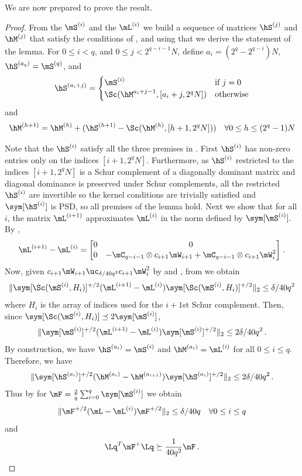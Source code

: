 We are now prepared to prove the result.
\AKMsmall*
\begin{proof}
From the %
%
$\mS^{(i)}$ and the $\mL^{(i)}$  %
we build a sequence of    
%
%
%
matrices $\hS^{(j)}$ and $\hM^{(j)}$ %
%
that satisfy the conditions of , and using that we derive
the statement of the lemma. For $0\leq i < q$, and $0\leq j <2^{q-i-1}N$, define
$a_i= (2^q-2^{q-i})N$, $\hS^{(a_q)}=\mS^{(q)}$, 
and
\[ 
\hS^{(a_i+j)} = \begin{cases}
\mS^{(i)} & \text{if } j=0\\
\Sc(\hM^{a_i+j-1},[a_i+j,2^qN]) & \text{otherwise}\end{cases}\]
and
$$\hM^{(h+1)} = \hM^{(h)}+(\hS^{(h+1)}-\Sc(\hM^{(h)},[h+1,2^qN])) \quad \forall 0\leq h \leq (2^q-1)N$$

Note that the %
$\hS^{(i)}$  %
satisfy all the three premises in . First $\hS^{(i)}$ has non-zero entries only on the indices $[i+ 1,2^q N]$. Furthermore, as $\hS^{(i)}$ restricted to the indices $[i+ 1,2^q N]$ is a Schur complement of a diagonally dominant matrix
%
%
and diagonal dominance is preserved under Schur complements, %
%
%
%
all the restricted %
$\hS^{(i)}$   %
are invertible so the kernel %
conditions  %
are trivially satisfied and $\sym[\hS^{(i)}]$ is PSD, so all premises of the lemma hold. 
Next we show that for all %
$i$,  %
the matrix %
%
$\mL^{(i+1)}$ approximates $\mL^{(i)}$ in the norm defined by $\sym[\mS^{(i)}]$.  By
,
$$\mL^{(i+1)}-\mL^{(i)} = \begin{bmatrix} 0 & 0\\ 0 & -\mC_{q-i-1}\otimes c_{i+1}\mW_{i+1}+\mC_{q-i-1}\otimes c_{i+1}\mW_{i}^2\end{bmatrix}\,.$$  %
Now, given $c_{i+1}\mW_{i+1} \uc_{\delta/40q^2}c_{i+1}\mW_{i}^2$ by  and
, from
%
%
we obtain
\[\|\sym[\Sc(\mS^{(i)},H_i)]^{+/2}(\mL^{(i+1)}-\mL^{(i)})\sym[{\Sc(\mS^{(i)},H_i)}]^{+/2}\|_2 \leq \delta/40q^2\]
where $H_i$
%
is the array of %
indices used for the $i+1$st Schur complement. %
Then,  %
since $\sym[\Sc(\mS^{(i)},H_i)] \preceq 2\sym[\mS^{(i)}]$,
\[\|\sym[{\mS^{(i)}}]^{+/2}(\mL^{(i+1)}-\mL^{(i)})\sym[{\mS^{(i)}}]^{+/2}\|_2 \leq 2\delta/40q^2\,.\]
%
By construction, we have $\hS^{(a_i)}=\mS^{(i)}$ and $\hM^{(a_i)}=\mL^{(i)}$ for all $0\leq i\leq q$. Therefore, we have
$$\|\sym[\hS^{(a_i)}]^{+/2}(\hM^{(a_{i})}-\hM^{(a_{i+1})})\sym[\hS^{(a_i)}]^{+/2}\|_2 \leq 2\delta/40q^2 \,.$$ %
Thus by  for $\mF=\frac{2}{q}\sum_{i=0}^q \sym[\mS^{(i)}]$ we obtain
\[\|\mF^{+/2}(\mL-\mL^{(i)})\mF^{+/2}\|_2\leq \delta/40q \quad \forall 0\leq i\leq q\]
and 
\[{\Lq}^T\mF^+\Lq \succeq \frac{1}{40q^2}\mF\,. \qedhere\] 
%
\end{proof}

